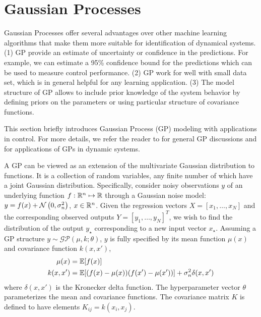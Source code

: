 \section{Gaussian Processes}
\label{sec:intro-gp}


Gaussian Processes offer several advantages over other machine learning algorithms that make them more suitable for identification of dynamical systems. (1) GP provide an estimate of uncertainty or confidence in the predictions. For example, we can estimate a 95\% confidence bound for the predictions which can be used to measure control performance. (2) GP work for well with small data set, which is in general helpful for any learning application. (3) The model structure of GP allows to include prior knowledge of the system behavior by defining priors on the parameters or using particular structure of covariance functions.


This section briefly introduces Gaussian Process (GP) modeling with applications in control.
For more details, we refer the reader to \cite{rasmussen06gaussian} for general GP discussions and \cite{kocijan16modelling} for applications of GPs in  dynamic systems.

A GP can be viewed as an extension of the multivariate Gaussian distribution to functions. 
It is a collection of random variables, any finite number of which have a joint Gaussian distribution.
Specifically, consider noisy observations \(y\) of an underlying function \(f: \mathbb{R}^n \mapsto \mathbb{R}\) through a Gaussian noise model: \(y = f(x) + \operatorname*{\mathcal{N}}\left(0, \sigma_n^2\right)\), \(x \in \mathbb{R}^n\).
Given  the regression vectors \(X = [x_1, \dots, x_N]\) and the corresponding observed outputs \(Y = [y_1, \dots, y_N]^T\), we wish to find the  distribution of the output \(y_\star\) corresponding to a new input vector \(x_\star\).
Assuming a GP structure \(y \sim \mathcal{GP}(\mu, k; \theta)\), \(y\) is fully specified by its mean function \(\mu(x)\) and covariance function \(k(x,x')\),
\begin{align*}
\mu(x) &= \mathbb{E} [f(x)] \\
k(x,x') &= \mathbb{E} [(f(x)-\mu(x)) (f(x') - \mu(x'))] + \sigma_n^2 \delta(x,x')
\end{align*}
where \(\delta(x,x')\) is the Kronecker delta function.
The hyperparameter vector \(\theta\) parameterizes the mean and covariance functions.
The covariance matrix \(K\) is defined to have elements \(K_{ij} = k(x_i, x_j)\).

